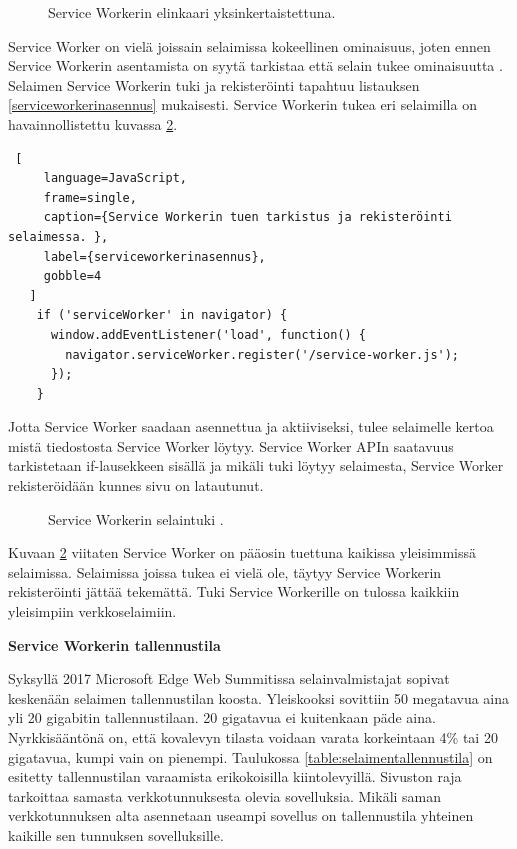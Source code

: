 \documentclass{tktltiki}
\begin{document}
\begin{figure}[h]
\begin{center}
\caption{Service Workerin elinkaari yksinkertaistettuna. }
\label{Service workerin elinkaari}
\end{center}
\end{figure}
\clearpage

Service Worker on vielä joissain selaimissa kokeellinen ominaisuus, joten ennen Service Workerin asentamista on syytä tarkistaa että selain tukee ominaisuutta \cite{hiltunen2018creating}. Selaimen Service Workerin tuki ja rekisteröinti tapahtuu listauksen \ref{serviceworkerinasennus} mukaisesti. Service Workerin tukea eri selaimilla on havainnollistettu kuvassa \ref{Service workerin selaintuki}.

\begin{lstlisting} [
     language=JavaScript,
     frame=single,
     caption={Service Workerin tuen tarkistus ja rekisteröinti selaimessa. },
     label={serviceworkerinasennus},
     gobble=4
   ]
    if ('serviceWorker' in navigator) {
      window.addEventListener('load', function() {
        navigator.serviceWorker.register('/service-worker.js');
      });
    }
\end{lstlisting}

Jotta Service Worker saadaan asennettua ja aktiiviseksi, tulee selaimelle kertoa mistä tiedostosta Service Worker löytyy. Service Worker APIn saatavuus tarkistetaan if-lausekkeen sisällä ja mikäli tuki löytyy selaimesta, Service Worker rekisteröidään kunnes sivu on latautunut. 

\begin{figure}[h]
\begin{center}
\caption{Service Workerin selaintuki \cite{caniuseServiceWorker}. }
\label{Service workerin selaintuki}
\end{center}
\end{figure}

Kuvaan \ref{Service workerin selaintuki} viitaten Service Worker on pääosin tuettuna kaikissa yleisimmissä selaimissa. Selaimissa joissa tukea ei vielä ole, täytyy Service Workerin rekisteröinti jättää tekemättä. Tuki Service Workerille on tulossa kaikkiin yleisimpiin verkkoselaimiin.

\textbf{Service Workerin tallennustila}

Syksyllä 2017 Microsoft Edge Web Summitissa selainvalmistajat sopivat keskenään selaimen tallennustilan koosta. \cite{Love} Yleiskooksi sovittiin 50 megatavua aina yli 20 gigabitin tallennustilaan. 20 gigatavua ei kuitenkaan päde aina. Nyrkkisääntönä on, että kovalevyn tilasta voidaan varata korkeintaan 4\% tai 20 gigatavua, kumpi vain on pienempi. Taulukossa \ref{table:selaimentallennustila} on esitetty tallennustilan varaamista erikokoisilla kiintolevyillä. Sivuston raja tarkoittaa samasta verkkotunnuksesta olevia sovelluksia. Mikäli saman verkkotunnuksen alta asennetaan useampi sovellus on tallennustila yhteinen kaikille sen tunnuksen sovelluksille. 
\end{document}
